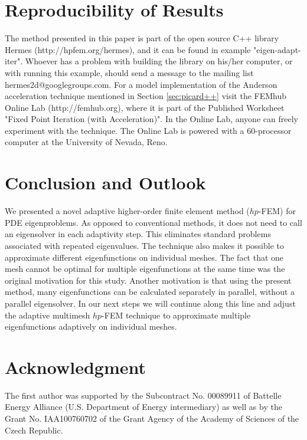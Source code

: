 \documentclass[preprint,12pt]{elsarticle}
\begin{document}
\section{Reproducibility of Results} \label{sec:reproducibility}

The method presented in this paper is part of the open source C++ library 
Hermes (http://hpfem.org/hermes), and it can be found in 
example "eigen-adapt-iter". Whoever
has a problem with building the library on his/her computer, or with running 
this example, should send
a message to the mailing list hermes2d@googlegroups.com. For a model 
implementation of the Anderson acceleration technique mentioned in Section 
\ref{sec:picard++} visit the FEMhub Online Lab (http://femhub.org), where
it is part of the Published Worksheet "Fixed Point Iteration (with Acceleration)".
In the Online Lab, anyone can freely experiment with the technique. The 
Online Lab is powered with a 60-processor computer at the University of 
Nevada, Reno.

\section{Conclusion and Outlook}\label{sec:conclusion}

We presented a novel adaptive higher-order finite element method ($hp$-FEM) 
for PDE eigenproblems. As opposed to conventional methods, it does not need
to call an eigensolver in each adaptivity step. This eliminates standard 
problems associated with repeated eigenvalues. The technique also makes it 
possible to approximate different eigenfunctions on individual meshes. 
The fact that one mesh cannot be optimal for multiple eigenfunctions at the
same time was the original motivation for this study. Another motivation is 
that using the present method, many eigenfunctions can be calculated separately 
in parallel, without a parallel eigensolver. In our next steps we will continue 
along this line and adjust the adaptive multimesh $hp$-FEM technique \cite{solin2} 
to approximate multiple eigenfunctions adaptively on individual meshes.

\section*{Acknowledgment}

The first author was supported by the Subcontract No. 00089911 of Battelle Energy
Alliance (U.S. Department of Energy intermediary) as well as by the Grant No. 
IAA100760702 of the Grant Agency of the Academy of Sciences of the Czech Republic.
\end{document}
